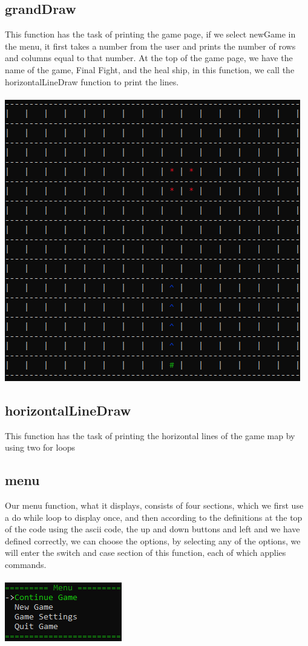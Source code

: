 \documentclass[12pt,a4paper]{article}
\begin{document}
	\subsection{grandDraw}
	This function has the task of printing the game page, if we select newGame in the menu, it first takes a number from the user and prints the number of rows and columns equal to that number.
    At the top of the game page, we have the name of the game, Final Fight, and the heal ship, in this function, we call the horizontalLineDraw function to print the lines.\\ \\
	\includegraphics[scale = 1]{Graphics/map.png}
	\subsection{horizontalLineDraw}
	This function has the task of printing the horizontal lines of the game map by using two for loops
	\subsection{menu}
	Our menu function, what it displays, consists of four sections, which we first use a do while loop to display once, and then according to the definitions at the top of the code using the ascii code, the up and down buttons and left
	and we have defined correctly, we can choose the options, by selecting any of the options, we will enter the switch and case section of this function, each of which applies commands.\\ \\
	\includegraphics[scale = 1]{Graphics/menu.png}
\end{document}
